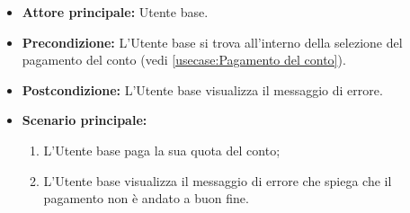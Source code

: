 \label{usecase:Visualizzazione errore pagamento}
\begin{itemize}
	\item \textbf{Attore principale:} Utente base.

	\item \textbf{Precondizione:}
	      L'Utente base si trova all'interno della selezione del pagamento del conto (vedi \autoref{usecase:Pagamento del conto}).

	\item \textbf{Postcondizione:}
	      L'Utente base visualizza il messaggio di errore.

	\item \textbf{Scenario principale:}
	      \begin{enumerate}
		      \item L'Utente base paga la sua quota del conto;
		      \item L'Utente base visualizza il messaggio di errore che spiega che il pagamento non è andato a buon fine.
	      \end{enumerate}
\end{itemize}
